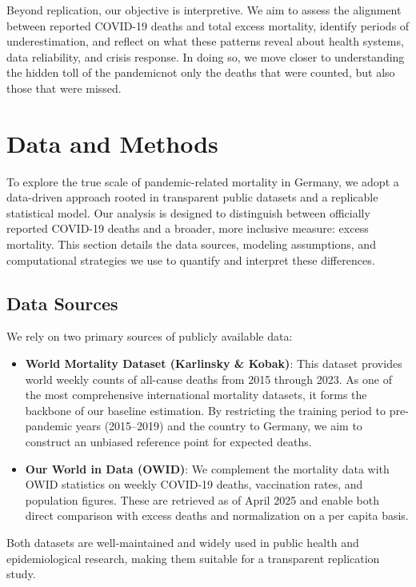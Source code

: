 \documentclass[a4paper,11pt]{article}
\begin{document}
Beyond replication, our objective is interpretive. We aim to assess the alignment between reported COVID-19 deaths and total excess mortality, identify periods of underestimation, and reflect on what these patterns reveal about health systems, data reliability, and crisis response. In doing so, we move closer to understanding the hidden toll of the pandemic\textemdash not only the deaths that were counted, but also those that were missed.

\section{Data and Methods}

To explore the true scale of pandemic-related mortality in Germany, we adopt a data-driven approach rooted in transparent public datasets and a replicable statistical model. Our analysis is designed to distinguish between officially reported COVID-19 deaths and a broader, more inclusive measure: excess mortality. This section details the data sources, modeling assumptions, and computational strategies we use to quantify and interpret these differences.

\subsection{Data Sources}

We rely on two primary sources of publicly available data:

\begin{itemize}
    \item \textbf{World Mortality Dataset (Karlinsky \& Kobak)}: This dataset provides world weekly counts of all-cause deaths from 2015 through 2023. As one of the most comprehensive international mortality datasets, it forms the backbone of our baseline estimation. By restricting the training period to pre-pandemic years (2015–2019) and the country to Germany, we aim to construct an unbiased reference point for expected deaths.
    
    \item \textbf{Our World in Data (OWID)}: We complement the mortality data with OWID statistics on weekly COVID-19 deaths, vaccination rates, and population figures. These are retrieved as of April 2025 and enable both direct comparison with excess deaths and normalization on a per capita basis.
\end{itemize}

Both datasets are well-maintained and widely used in public health and epidemiological research, making them suitable for a transparent replication study.
\end{document}
